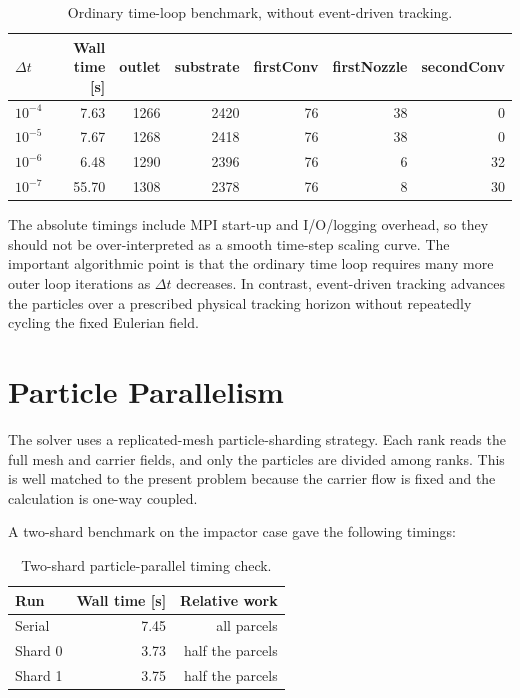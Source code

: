\documentclass[11pt]{article}
\begin{document}
\begin{table}[h]
\centering
\caption{Ordinary time-loop benchmark, without event-driven tracking.}
\label{tab:loop}
\begin{tabular}{@{}lrrrrrr@{}}
\toprule
\(\Delta t\) & Wall time [s] & outlet & substrate & firstConv & firstNozzle & secondConv \\
\midrule
\(10^{-4}\) & 7.63  & 1266 & 2420 & 76 & 38 & 0  \\
\(10^{-5}\) & 7.67  & 1268 & 2418 & 76 & 38 & 0  \\
\(10^{-6}\) & 6.48  & 1290 & 2396 & 76 & 6  & 32 \\
\(10^{-7}\) & 55.70 & 1308 & 2378 & 76 & 8  & 30 \\
\bottomrule
\end{tabular}
\end{table}

The absolute timings include MPI start-up and I/O/logging overhead, so they
should not be over-interpreted as a smooth time-step scaling curve.  The
important algorithmic point is that the ordinary time loop requires many more
outer loop iterations as \(\Delta t\) decreases.  In contrast, event-driven
tracking advances the particles over a prescribed physical tracking horizon
without repeatedly cycling the fixed Eulerian field.

\section{Particle Parallelism}

The solver uses a replicated-mesh particle-sharding strategy.  Each rank reads
the full mesh and carrier fields, and only the particles are divided among
ranks.  This is well matched to the present problem because the carrier flow is
fixed and the calculation is one-way coupled.

A two-shard benchmark on the impactor case gave the following timings:

\begin{table}[h]
\centering
\caption{Two-shard particle-parallel timing check.}
\label{tab:parallel}
\begin{tabular}{@{}lrr@{}}
\toprule
Run & Wall time [s] & Relative work \\
\midrule
Serial & 7.45 & all parcels \\
Shard 0 & 3.73 & half the parcels \\
Shard 1 & 3.75 & half the parcels \\
\bottomrule
\end{tabular}
\end{table}
\end{document}
